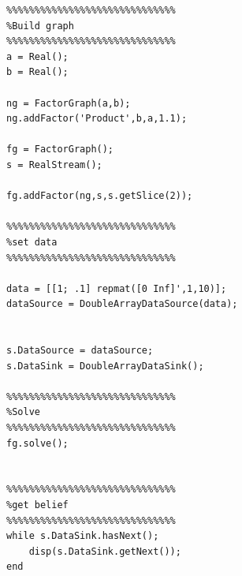 \ifmatlab
\begin{lstlisting}
%%%%%%%%%%%%%%%%%%%%%%%%%%%%%%                                                                                                
%Build graph                                                                                                                  
%%%%%%%%%%%%%%%%%%%%%%%%%%%%%%                                                                                                
a = Real();
b = Real();

ng = FactorGraph(a,b);
ng.addFactor('Product',b,a,1.1);

fg = FactorGraph();
s = RealStream();

fg.addFactor(ng,s,s.getSlice(2));

%%%%%%%%%%%%%%%%%%%%%%%%%%%%%%                                                                                                
%set data                                                                                                                     
%%%%%%%%%%%%%%%%%%%%%%%%%%%%%%                                                                                                

data = [[1; .1] repmat([0 Inf]',1,10)];
dataSource = DoubleArrayDataSource(data);


s.DataSource = dataSource;
s.DataSink = DoubleArrayDataSink();

%%%%%%%%%%%%%%%%%%%%%%%%%%%%%%                                                                                                
%Solve                                                                                                                        
%%%%%%%%%%%%%%%%%%%%%%%%%%%%%%                                                                                                
fg.solve();


%%%%%%%%%%%%%%%%%%%%%%%%%%%%%%                                                                                                
%get belief                                                                                                                        
%%%%%%%%%%%%%%%%%%%%%%%%%%%%%%                                                                                                
while s.DataSink.hasNext();
    disp(s.DataSink.getNext());
end
\end{lstlisting}
\fi

